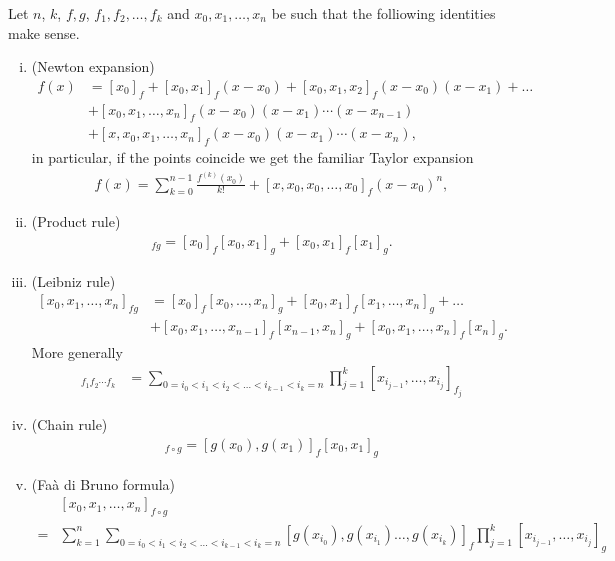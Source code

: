 \begin{prop}\label{div_identities}
	Let $n$, $k$, $f, g$, $f_{1}, f_{2}, \ldots, f_{k}$ and $x_{0}, x_{1}, \ldots, x_{n}$ be such that the folliowing identities make sense.
	\begin{enumerate}[(i)]
		\item (Newton expansion)
		\begin{align}\label{newton_expansion}
			f(x) &= [x_{0}]_{f} + [x_{0}, x_{1}]_{f} (x - x_{0})  + [x_{0}, x_{1}, x_{2}]_{f} (x - x_{0}) (x - x_{1}) + \ldots \\
			& + [x_{0}, x_{1}, \ldots, x_{n}]_{f} (x - x_{0}) (x - x_{1}) \cdots (x - x_{n - 1}) \nonumber\\
			& + [x, x_{0}, x_{1}, \ldots, x_{n}]_{f} (x - x_{0}) (x - x_{1}) \cdots (x - x_{n}) \nonumber,
		\end{align}
		in particular, if the points coincide we get the familiar Taylor expansion
		\begin{align}\label{taylor_expansion}
			f(x) = \sum_{k = 0}^{n - 1} \frac{f^{(k)}(x_{0})}{k!} + [x, x_{0}, x_{0}, \ldots, x_{0}]_{f} (x - x_{0})^{n},
		\end{align}
		\item (Product rule)
		\begin{align*}
			[x_{0}, x_{1}]_{f g} = [x_{0}]_{f} [x_{0}, x_{1}]_{g} + [x_{0}, x_{1}]_{f} [x_{1}]_{g}.
		\end{align*}
		\item (Leibniz rule)
		\begin{align}\label{leibniz_rule}
			[x_{0}, x_{1}, \ldots, x_{n}]_{f g} &= [x_{0}]_{f} [x_{0}, \ldots, x_{n}]_{g} + [x_{0}, x_{1}]_{f} [x_{1}, \ldots, x_{n}]_{g} + \ldots\\
			&+ [x_{0}, x_{1}, \ldots, x_{n - 1}]_{f} [x_{n - 1}, x_{n}]_{g} + [x_{0}, x_{1}, \ldots, x_{n}]_{f} [x_{n}]_{g} \nonumber.
		\end{align}
		More generally
		\begin{align*}
			[x_{0}, x_{1}, \ldots, x_{n}]_{f_{1} f_{2} \cdots f_{k}} &= \sum_{0 = i_{0} < i_{1} < i_{2} < \ldots < i_{k - 1} < i_{k} = n} \prod_{j = 1}^{k} [x_{i_{j - 1}}, \ldots, x_{i_{j}}]_{f_{j}}
		\end{align*}
		\item (Chain rule)
		\begin{align*}
			[x_{0}, x_{1}]_{f \circ g} = [g(x_{0}), g(x_{1})]_{f} [x_{0}, x_{1}]_{g}
		\end{align*}
		\item (Fa\`{a} di Bruno formula)
		\begin{align*}
			& [x_{0}, x_{1}, \ldots, x_{n}]_{f \circ g} \\
			=& \sum_{k = 1}^{n} \sum_{0 = i_{0}< i_{1} < i_{2} < \ldots < i_{k - 1} < i_{k} =  n} [g(x_{i_{0}}), g(x_{i_{1}})\ldots , g(x_{i_{k}})]_{f} \prod_{j = 1}^{k} [x_{i_{j - 1}}, \ldots, x_{i_{j}}]_{g}
		\end{align*}
	\end{enumerate}
\end{prop}
